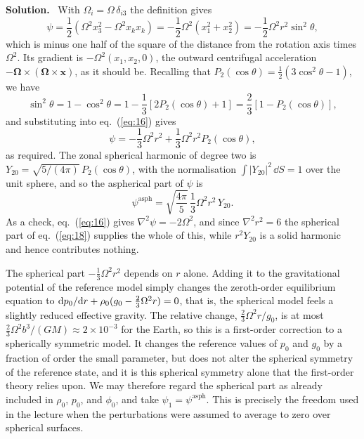 \documentclass[a4paper,12pt]{paper}
\newenvironment{solution}{\par\noindent\textbf{Solution.}\ }{\par\medskip}
\begin{document}
\begin{solution}
With $\Omega_{i}=\Omega\,\delta_{i3}$ the definition gives
\begin{equation}
\psi=\frac{1}{2}\left(\Omega^{2}x_{3}^{2}-\Omega^{2}x_{k}x_{k}\right)=-\frac{1}{2}\Omega^{2}\left(x_{1}^{2}+x_{2}^{2}\right)
=-\frac{1}{2}\Omega^{2}r^{2}\sin^{2}\theta,
\label{eq:16}
\end{equation}
which is minus one half of the square of the distance from the rotation axis times $\Omega^{2}$.
Its gradient is $-\Omega^{2}(x_{1},x_{2},0)$, the outward centrifugal acceleration
$-\bm{\Omega}\times(\bm{\Omega}\times\mathbf{x})$, as it should be. Recalling that
$P_{2}(\cos\theta)=\frac{1}{2}(3\cos^{2}\theta-1)$, we have
\begin{equation}
\sin^{2}\theta=1-\cos^{2}\theta=1-\frac{1}{3}\left[2P_{2}(\cos\theta)+1\right]=\frac{2}{3}\left[1-P_{2}(\cos\theta)\right],
\label{eq:17}
\end{equation}
and substituting into eq.~(\ref{eq:16}) gives
\begin{equation}
\psi=-\frac{1}{3}\Omega^{2}r^{2}+\frac{1}{3}\Omega^{2}r^{2}P_{2}(\cos\theta),
\label{eq:18}
\end{equation}
as required. The zonal spherical harmonic of degree two is
$Y_{20}=\sqrt{5/(4\pi)}\,P_{2}(\cos\theta)$, with the normalisation
$\int|Y_{20}|^{2}\,\dd S=1$ over the unit sphere, and so the aspherical part of $\psi$ is
\begin{equation}
\psi^{\mathrm{asph}}=\sqrt{\frac{4\pi}{5}}\,\frac{1}{3}\Omega^{2}r^{2}\,Y_{20}.
\label{eq:19}
\end{equation}
As a check, eq.~(\ref{eq:16}) gives $\nabla^{2}\psi=-2\Omega^{2}$, and since $\nabla^{2}r^{2}=6$ the
spherical part of eq.~(\ref{eq:18}) supplies the whole of this, while $r^{2}Y_{20}$ is a solid
harmonic and hence contributes nothing.

The spherical part $-\frac{1}{3}\Omega^{2}r^{2}$ depends on $r$ alone. Adding it to the
gravitational potential of the reference model simply changes the zeroth-order equilibrium equation
to $\mathrm{d} p_{0}/\mathrm{d} r+\rho_{0}(g_{0}-\frac{2}{3}\Omega^{2}r)=0$, that is, the spherical model feels a
slightly reduced effective gravity. The relative change, $\frac{2}{3}\Omega^{2}r/g_{0}$, is at most
$\frac{2}{3}\Omega^{2}b^{3}/(GM)\approx2\times10^{-3}$ for the Earth, so this is a first-order correction
to a spherically symmetric model. It changes the reference values of $p_{0}$ and $g_{0}$ by a fraction
of order the small parameter, but does not alter the spherical symmetry of the reference state, and
it is this spherical symmetry alone that the first-order theory relies upon. We may therefore
regard the spherical part as already included in $\rho_{0}$, $p_{0}$, and $\phi_{0}$, and take
$\psi_{1}=\psi^{\mathrm{asph}}$. This is precisely the freedom used in the lecture when the
perturbations were assumed to average to zero over spherical surfaces.


\end{solution}
\end{document}

